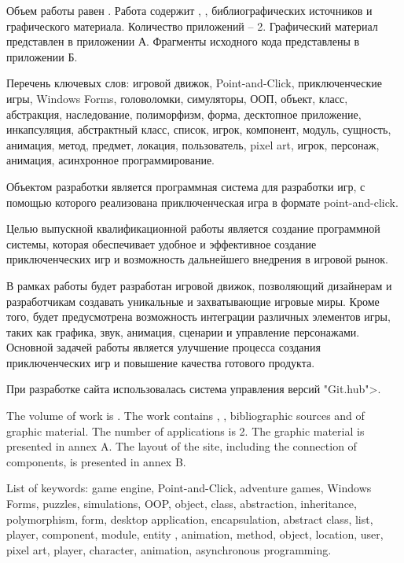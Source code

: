 
Объем работы равен . Работа содержит , ,  библиографических источников и  графического материала. Количество приложений – 2. Графический материал представлен в приложении А. Фрагменты исходного кода представлены в приложении Б.

Перечень ключевых слов: игровой движок, Point-and-Click, приключенческие игры, Windows Forms, головоломки, симуляторы, ООП, объект, класс, абстракция, наследование, полиморфизм, форма, десктопное приложение, инкапсуляция, абстрактный класс, список, игрок, компонент, модуль, сущность, анимация, метод, предмет, локация, пользователь, pixel art, игрок, персонаж, анимация, асинхронное программирование.

Объектом разработки является программная система для разработки игр, с помощью которого реализована приключенческая игра в формате point-and-click.

Целью выпускной квалификационной работы является создание программной системы, которая обеспечивает удобное и эффективное создание приключенческих игр и возможность дальнейшего внедрения в игровой рынок.

В рамках работы будет разработан игровой движок, позволяющий дизайнерам и разработчикам создавать уникальные и захватывающие игровые миры. Кроме того, будет предусмотрена возможность интеграции различных элементов игры, таких как графика, звук, анимация, сценарии и управление персонажами. Основной задачей работы является улучшение процесса создания приключенческих игр и повышение качества готового продукта.

При разработке сайта использовалась система управления версий "Git.hub">.

  
The volume of work is . The work contains , ,  bibliographic sources and  of graphic material. The number of applications is 2. The graphic material is presented in annex A. The layout of the site, including the connection of components, is presented in annex B.

List of keywords: game engine, Point-and-Click, adventure games, Windows Forms, puzzles, simulations, OOP, object, class, abstraction, inheritance, polymorphism, form, desktop application, encapsulation, abstract class, list, player, component, module, entity , animation, method, object, location, user, pixel art, player, character, animation, asynchronous programming.

